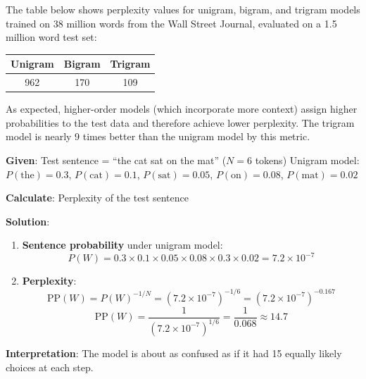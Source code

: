 \documentclass[11pt,a4paper]{article}
\begin{document}
\begin{tcolorbox}[colback=green!5!white,colframe=green!75!black,title=\textbf{Worked Example 5: Perplexity on WSJ Corpus}]
The table below shows perplexity values for unigram, bigram, and trigram models trained on 38 million words from the Wall Street Journal, evaluated on a 1.5 million word test set:
\begin{center}
\begin{tabular}{|c|c|c|}
\hline
\textbf{Unigram} & \textbf{Bigram} & \textbf{Trigram} \\ \hline
962 & 170 & 109 \\ \hline
\end{tabular}
\end{center}

As expected, higher-order models (which incorporate more context) assign higher probabilities to the test data and therefore achieve lower perplexity. The trigram model is nearly 9 times better than the unigram model by this metric.
\end{tcolorbox}

\begin{tcolorbox}[colback=green!5!white,colframe=green!75!black,title=\textbf{Worked Example 6: Perplexity of a Test Sentence}]
\textbf{Given}: Test sentence = ``the cat sat on the mat'' ($N=6$ tokens)
Unigram model: $P(\text{the}) = 0.3$, $P(\text{cat}) = 0.1$, $P(\text{sat}) = 0.05$, $P(\text{on}) = 0.08$, $P(\text{mat}) = 0.02$

\textbf{Calculate}: Perplexity of the test sentence

\textbf{Solution}:
\begin{enumerate}
    \item \textbf{Sentence probability} under unigram model:
    \[
    P(W) = 0.3 \times 0.1 \times 0.05 \times 0.08 \times 0.3 \times 0.02 = 7.2 \times 10^{-7}
    \]
    
    \item \textbf{Perplexity}:
    \[
    \text{PP}(W) = P(W)^{-1/N} = (7.2 \times 10^{-7})^{-1/6} = (7.2 \times 10^{-7})^{-0.167}
    \]
    \[
    \text{PP}(W) = \frac{1}{(7.2 \times 10^{-7})^{1/6}} = \frac{1}{0.068} \approx 14.7
    \]
\end{enumerate}

\textbf{Interpretation}: The model is about as confused as if it had 15 equally likely choices at each step.
\end{tcolorbox}
\end{document}
